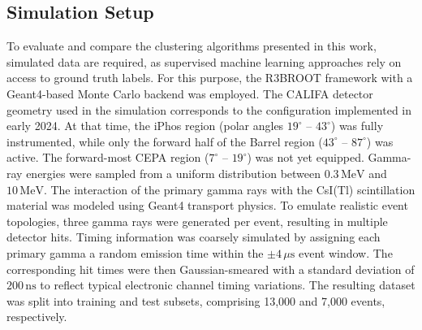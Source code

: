 \documentclass[final,5p,times,twocolumn]{elsarticle}
\begin{document}
\subsection{Simulation Setup}\label{s_sec:data_sim}
To evaluate and compare the clustering algorithms presented in this work, simulated data are required, as supervised machine learning approaches rely on access to ground truth labels. For this purpose, the R3BROOT framework with a Geant4-based Monte Carlo backend was employed.\newline
The CALIFA detector geometry used in the simulation corresponds to the configuration implemented in early 2024. At that time, the iPhos region (polar angles $19^\circ$ -- $43^\circ$) was fully instrumented, while only the forward half of the Barrel region ($43^\circ$ -- $87^\circ$) was active. The forward-most CEPA region ($7^\circ$ -- $19^\circ$) was not yet equipped.\newline
Gamma-ray energies were sampled from a uniform distribution between $0.3\,\mathrm{MeV}$ and $10\,\mathrm{MeV}$. The interaction of the primary gamma rays with the CsI(Tl) scintillation material was modeled using Geant4 transport physics.\newline
To emulate realistic event topologies, three gamma rays were generated per event, resulting in multiple detector hits. Timing information was coarsely simulated by assigning each primary gamma a random emission time within the $\pm 4\,\mu\mathrm{s}$ event window. The corresponding hit times were then Gaussian-smeared with a standard deviation of $200\,\mathrm{ns}$ to reflect typical electronic channel timing variations.\newline
The resulting dataset was split into training and test subsets, comprising 13{,}000 and 7{,}000 events, respectively.
\end{document}
